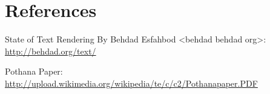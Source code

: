 \chapter{References}

State of Text Rendering By Behdad Esfahbod <behdad behdad org>: {\url{http://behdad.org/text/}}

Pothana Paper: {\url{http://upload.wikimedia.org/wikipedia/te/c/c2/Pothanapaper.PDF}}
